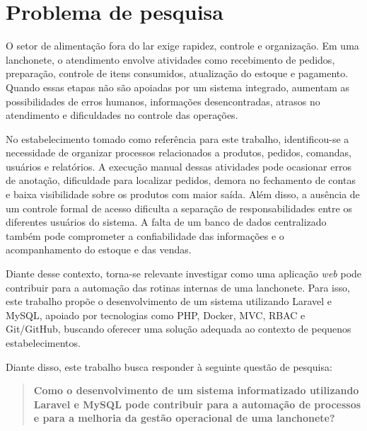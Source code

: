 \section{Problema de pesquisa}

O setor de alimentação fora do lar exige rapidez, controle e organização. Em uma lanchonete, o atendimento envolve atividades como recebimento de pedidos, preparação, controle de itens consumidos, atualização do estoque e pagamento. Quando essas etapas não são apoiadas por um sistema integrado, aumentam as possibilidades de erros humanos, informações desencontradas, atrasos no atendimento e dificuldades no controle das operações.

No estabelecimento tomado como referência para este trabalho, identificou-se a necessidade de organizar processos relacionados a produtos, pedidos, comandas, usuários e relatórios. A execução manual dessas atividades pode ocasionar erros de anotação, dificuldade para localizar pedidos, demora no fechamento de contas e baixa visibilidade sobre os produtos com maior saída. Além disso, a ausência de um controle formal de acesso dificulta a separação de responsabilidades entre os diferentes usuários do sistema. A falta de um banco de dados centralizado também pode comprometer a confiabilidade das informações e o acompanhamento do estoque e das vendas.

Diante desse contexto, torna-se relevante investigar como uma aplicação \textit{web} pode contribuir para a automação das rotinas internas de uma lanchonete. Para isso, este trabalho propõe o desenvolvimento de um sistema utilizando Laravel e MySQL, apoiado por tecnologias como PHP, Docker, MVC, RBAC e Git/GitHub, buscando oferecer uma solução adequada ao contexto de pequenos estabelecimentos.

Diante disso, este trabalho busca responder à seguinte questão de pesquisa:

\begin{quote}
\textbf{Como o desenvolvimento de um sistema informatizado utilizando Laravel e MySQL pode contribuir para a automação de processos e para a melhoria da gestão operacional de uma lanchonete?}
\end{quote}
